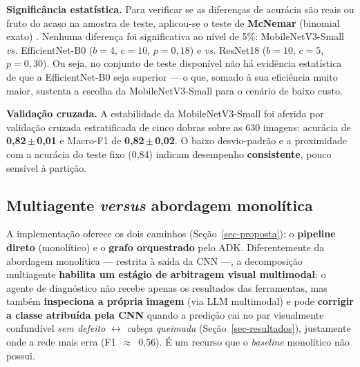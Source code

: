 \documentclass[
	article,			%
	11pt,				%
	oneside,			%
	a4paper,			%
	english,			%
	brazilian,			%
	sumario=tradicional
	]{abntex2}
\begin{document}
\noindent\textbf{Significância estatística.} Para verificar se as diferenças de
acurácia são reais ou fruto do acaso na amostra de teste, aplicou-se o teste de
\textbf{McNemar} (binomial exato) \cite{dietterich1998tests}. Nenhuma diferença foi
significativa ao nível de 5\%: MobileNetV3-Small \textit{vs.} EfficientNet-B0
($b{=}4$, $c{=}10$, $p{=}0{,}18$) e \textit{vs.} ResNet18 ($b{=}10$, $c{=}5$,
$p{=}0{,}30$). Ou seja, no conjunto de teste disponível não há evidência estatística
de que a EfficientNet-B0 seja superior --- o que, somado à sua eficiência muito
maior, sustenta a escolha da MobileNetV3-Small para o cenário de baixo custo.

\noindent\textbf{Validação cruzada.} A estabilidade da MobileNetV3-Small foi aferida
por validação cruzada estratificada de cinco dobras sobre as 630 imagens: acurácia
de \textbf{0,82\,$\pm$\,0,01} e Macro-F1 de \textbf{0,82\,$\pm$\,0,02}. O baixo
desvio-padrão e a proximidade com a acurácia do teste fixo (0,84) indicam
desempenho \textbf{consistente}, pouco sensível à partição.

\subsection{Multiagente \textit{versus} abordagem monolítica}\label{sec-baseline}

A implementação oferece os dois caminhos (Seção~\ref{sec-proposta}): o
\textbf{pipeline direto} (monolítico) e o \textbf{grafo orquestrado} pelo ADK.
Diferentemente da abordagem monolítica --- restrita à saída da CNN ---, a
decomposição multiagente \textbf{habilita um estágio de arbitragem visual
multimodal}: o agente de diagnóstico não recebe apenas os resultados das
ferramentas, mas também \textbf{inspeciona a própria imagem} (via LLM multimodal) e
pode \textbf{corrigir a classe atribuída pela CNN} quando a predição cai no par
visualmente confundível \emph{sem defeito} $\leftrightarrow$ \emph{cabeça queimada}
(Seção~\ref{sec-resultados}), justamente onde a rede mais erra (F1~$\approx$~0,56).
É um recurso que o \textit{baseline} monolítico não possui.
\end{document}

